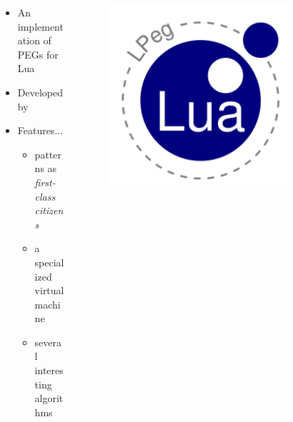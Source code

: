 \documentclass{beamer}
\begin{document}
\begin{frame}{\lpeg{}}
    \begin{columns}
        \begin{column}{0.7\textwidth}
            \begin{itemize}
                \item An implementation of PEGs for Lua
                \item Developed by \cite{ierusalimschy_text_2009}
                \item Features...
                \begin{itemize}
                    \item patterns as \emph{first-class citizens}
                    \item a specialized virtual machine
                    \item several interesting algorithms
                \end{itemize}
            \end{itemize}
        \end{column}
        \begin{column}{0.3\textwidth}
            \begin{figure}
                \centering
                \includegraphics[width=0.8\textwidth]{lpeg.pdf}
            \end{figure}
        \end{column}
    \end{columns}
\end{frame}
\end{document}
